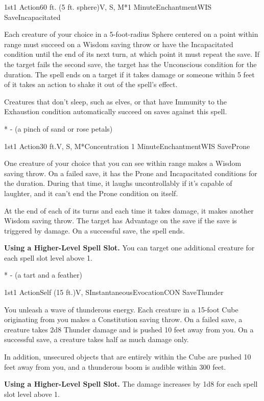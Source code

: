 \begin{Spell}{1st}{1 Action}{60 ft. (5 ft. sphere)}{V, S, M*}{1 Minute}{Enchantment}{WIS Save}{Incapacitated}

Each creature of your choice in a 5-foot-radius Sphere centered on a point within range must succeed on a Wisdom saving throw or have the Incapacitated condition until the end of its next turn, at which point it must repeat the save. If the target fails the second save, the target has the Unconscious condition for the duration. The spell ends on a target if it takes damage or someone within 5 feet of it takes an action to shake it out of the spell's effect.

Creatures that don't sleep, such as elves, or that have Immunity to the Exhaustion condition automatically succeed on saves against this spell.

* - (a pinch of sand or rose petals)
\end{Spell}

\begin{Spell}{1st}{1 Action}{30 ft.}{V, S, M*}{Concentration 1 Minute}{Enchantment}{WIS Save}{Prone}

One creature of your choice that you can see within range makes a Wisdom saving throw. On a failed save, it has the Prone and Incapacitated conditions for the duration. During that time, it laughs uncontrollably if it's capable of laughter, and it can't end the Prone condition on itself.

At the end of each of its turns and each time it takes damage, it makes another Wisdom saving throw. The target has Advantage on the save if the save is triggered by damage. On a successful save, the spell ends.

\textbf{Using a Higher-Level Spell Slot.} You can target one additional creature for each spell slot level above 1.

* - (a tart and a feather)
\end{Spell}

\begin{Spell}{1st}{1 Action}{Self (15 ft.)}{V, S}{Instantaneous}{Evocation}{CON Save}{Thunder}

You unleash a wave of thunderous energy. Each creature in a 15-foot Cube originating from you makes a Constitution saving throw. On a failed save, a creature takes 2d8 Thunder damage and is pushed 10 feet away from you. On a successful save, a creature takes half as much damage only.

In addition, unsecured objects that are entirely within the Cube are pushed 10 feet away from you, and a thunderous boom is audible within 300 feet.

\textbf{Using a Higher-Level Spell Slot.} The damage increases by 1d8 for each spell slot level above 1.
\end{Spell}

